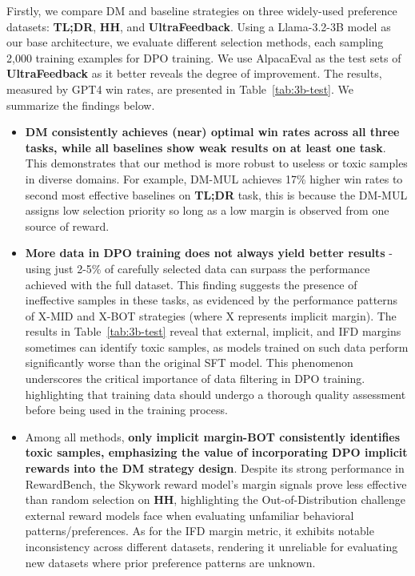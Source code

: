 {Firstly, we compare DM and baseline strategies on three widely-used preference datasets: \textbf{TL;DR}, \textbf{HH}, and \textbf{UltraFeedback}. Using a Llama-3.2-3B model as our base architecture, we evaluate different selection methods, each sampling 2,000 training examples for DPO training. We use AlpacaEval as the test sets of \textbf{UltraFeedback} as it better reveals the degree of improvement. The results, measured by GPT4 win rates, are presented in Table~\ref{tab:3b-test}. We summarize the findings below.
\begin{itemize}[leftmargin=*]
    \item \textbf{DM consistently achieves (near) optimal win rates across all three tasks, while all baselines show weak results on at least one task}. This demonstrates that our method is more robust to useless or toxic samples in diverse domains. For example, DM-MUL achieves 17\% higher win rates to second most effective baselines on \textbf{TL;DR} task, this is because the DM-MUL assigns low selection priority so long as a low margin is observed from one source of reward.
    
    \item \textbf{More data in DPO training does not always yield better results} - using just 2-5\% of carefully selected data can surpass the performance achieved with the full dataset. This finding suggests the presence of ineffective samples in these tasks, as evidenced by the performance patterns of X-MID and X-BOT strategies (where X represents implicit margin). The results in Table~\ref{tab:3b-test} reveal that external, implicit, and IFD margins sometimes can identify toxic samples, as models trained on such data perform significantly worse than the original SFT model. This phenomenon underscores the critical importance of data filtering in DPO training.
    highlighting that training data should undergo a thorough quality assessment before being used in the training process.

    \item Among all methods, \textbf{only implicit margin-BOT consistently identifies toxic samples, emphasizing the value of incorporating DPO implicit rewards into the DM strategy design}. Despite its strong performance in RewardBench, the Skywork reward model's margin signals prove less effective than random selection on \textbf{HH}, highlighting the Out-of-Distribution challenge external reward models face when evaluating unfamiliar behavioral patterns/preferences. As for the IFD margin metric, it exhibits notable inconsistency across different datasets, rendering it unreliable for evaluating new datasets where prior preference patterns are unknown.
    

\end{itemize}}
